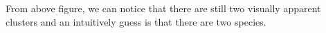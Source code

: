 From above figure, we can notice that there are still two visually apparent clusters and an intuitively guess is that there are two species.


\newpage


\clearpage

%
%
%



